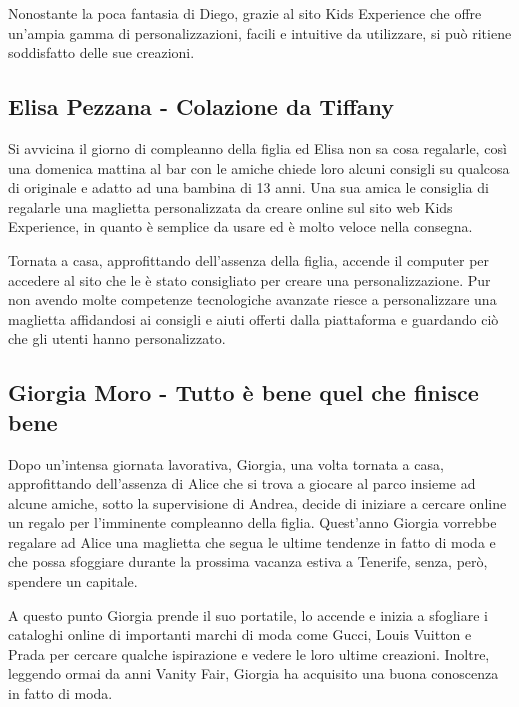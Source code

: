 \documentclass[12pt,italian,]{report}
\begin{document}
Nonostante la poca fantasia di Diego, grazie al sito Kids Experience che
offre un'ampia gamma di personalizzazioni, facili e intuitive da
utilizzare, si può ritiene soddisfatto delle sue creazioni.

\hypertarget{elisa-pezzana---colazione-da-tiffany}{%
\subsection{Elisa Pezzana - Colazione da
Tiffany}\label{elisa-pezzana---colazione-da-tiffany}}

Si avvicina il giorno di compleanno della figlia ed Elisa non sa cosa
regalarle, così una domenica mattina al bar con le amiche chiede loro
alcuni consigli su qualcosa di originale e adatto ad una bambina di 13
anni. Una sua amica le consiglia di regalarle una maglietta
personalizzata da creare online sul sito web Kids Experience, in quanto
è semplice da usare ed è molto veloce nella consegna.

Tornata a casa, approfittando dell'assenza della figlia, accende il
computer per accedere al sito che le è stato consigliato per creare una
personalizzazione. Pur non avendo molte competenze tecnologiche avanzate
riesce a personalizzare una maglietta affidandosi ai consigli e aiuti
offerti dalla piattaforma e guardando ciò che gli utenti hanno
personalizzato.

\hypertarget{giorgia-moro---tutto-bene-quel-che-finisce-bene}{%
\subsection{Giorgia Moro - Tutto è bene quel che finisce
bene}\label{giorgia-moro---tutto-bene-quel-che-finisce-bene}}

Dopo un'intensa giornata lavorativa, Giorgia, una volta tornata a casa,
approfittando dell'assenza di Alice che si trova a giocare al parco
insieme ad alcune amiche, sotto la supervisione di Andrea, decide di
iniziare a cercare online un regalo per l'imminente compleanno della
figlia. Quest'anno Giorgia vorrebbe regalare ad Alice una maglietta che
segua le ultime tendenze in fatto di moda e che possa sfoggiare durante
la prossima vacanza estiva a Tenerife, senza, però, spendere un
capitale.

A questo punto Giorgia prende il suo portatile, lo accende e inizia a
sfogliare i cataloghi online di importanti marchi di moda come Gucci,
Louis Vuitton e Prada per cercare qualche ispirazione e vedere le loro
ultime creazioni. Inoltre, leggendo ormai da anni Vanity Fair, Giorgia
ha acquisito una buona conoscenza in fatto di moda.
\end{document}
